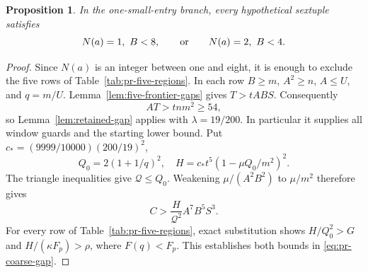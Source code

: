 \documentclass[12pt]{article}
\newtheorem{proposition}[theorem]{Proposition}
\numberwithin{equation}{section}
\begin{document}
\begin{proposition}\label{prop:pr-H2}
In the one-small-entry branch, every hypothetical sextuple satisfies
\[
 N(a)=1,\ B<8,\qquad\hbox{or}\qquad N(a)=2,\ B<4.
\]
\end{proposition}
\begin{proof}
Since \(N(a)\) is an integer between one and eight, it is enough to
exclude the five rows of Table~\ref{tab:pr-five-regions}. In each row
\(B\ge m\), \(A^2\ge n\), \(A\le U\), and \(q=m/U\).
Lemma~\ref{lem:five-frontier-gaps} gives \(T>tABS\).
Consequently
\[
 AT>tnm^2\ge54,
\]
so Lemma~\ref{lem:retained-gap} applies with \(\lambda=19/200\).
In particular it supplies all window guards and the starting lower
bound. Put \(c_*=(9999/10000)(200/19)^2\),
\[
 Q_0=2(1+1/q)^2,\quad
 H=c_*t^5(1-\mu Q_0/m^2)^2.
\]
The triangle inequalities give \(\mathcal Q\le Q_0\).
Weakening \(\mu/(A^2B^2)\) to \(\mu/m^2\) therefore gives
\[
 C>\frac{H}{\mathcal Q^2}A^7B^5S^3.
\]
For every row of Table~\ref{tab:pr-five-regions}, exact substitution
shows \(H/Q_0^2>G\) and \(H/(\kappa F_p)>\rho\), where
\(F(q)<F_p\). This establishes both bounds in
\eqref{eq:pr-coarse-gap}.


\end{proof}
\end{document}

